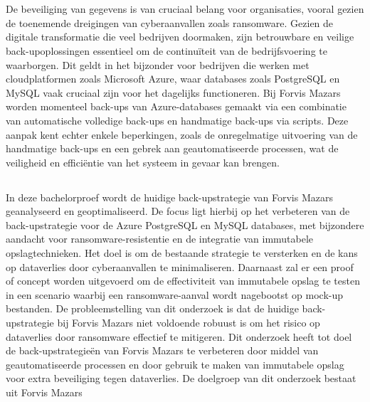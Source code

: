 
\chapter{}%
\label{ch:inleiding}

De beveiliging van gegevens is van cruciaal belang voor organisaties, vooral gezien de toenemende dreigingen van cyberaanvallen zoals ransomware. Gezien de digitale transformatie die veel bedrijven doormaken, zijn betrouwbare en veilige back-upoplossingen essentieel om de continuïteit van de bedrijfsvoering te waarborgen. Dit geldt in het bijzonder voor bedrijven die werken met cloudplatformen zoals Microsoft Azure, waar databases zoals PostgreSQL en MySQL vaak cruciaal zijn voor het dagelijks functioneren. Bij Forvis Mazars worden momenteel back-ups van Azure-databases gemaakt via een combinatie van automatische volledige back-ups en handmatige back-ups via scripts. Deze aanpak kent echter enkele beperkingen, zoals de onregelmatige uitvoering van de handmatige back-ups en een gebrek aan geautomatiseerde processen, wat de veiligheid en efficiëntie van het systeem in gevaar kan brengen.



\section{}%
\label{sec:probleemstelling}
In deze bachelorproef wordt de huidige back-upstrategie van Forvis Mazars geanalyseerd en geoptimaliseerd. De focus ligt hierbij op het verbeteren van de back-upstrategie voor de Azure PostgreSQL en MySQL databases, met bijzondere aandacht voor ransomware-resistentie en de integratie van immutabele opslagtechnieken. Het doel is om de bestaande strategie te versterken en de kans op dataverlies door cyberaanvallen te minimaliseren. Daarnaast zal er een proof of concept worden uitgevoerd om de effectiviteit van immutabele opslag te testen in een scenario waarbij een ransomware-aanval wordt nagebootst op mock-up bestanden. De probleemstelling van dit onderzoek is dat de huidige back-upstrategie bij Forvis Mazars niet voldoende robuust is om het risico op dataverlies door ransomware effectief te mitigeren. Dit onderzoek heeft tot doel de back-upstrategieën van Forvis Mazars te verbeteren door middel van geautomatiseerde processen en door gebruik te maken van immutabele opslag voor extra beveiliging tegen dataverlies. De doelgroep van dit onderzoek bestaat uit Forvis Mazars


